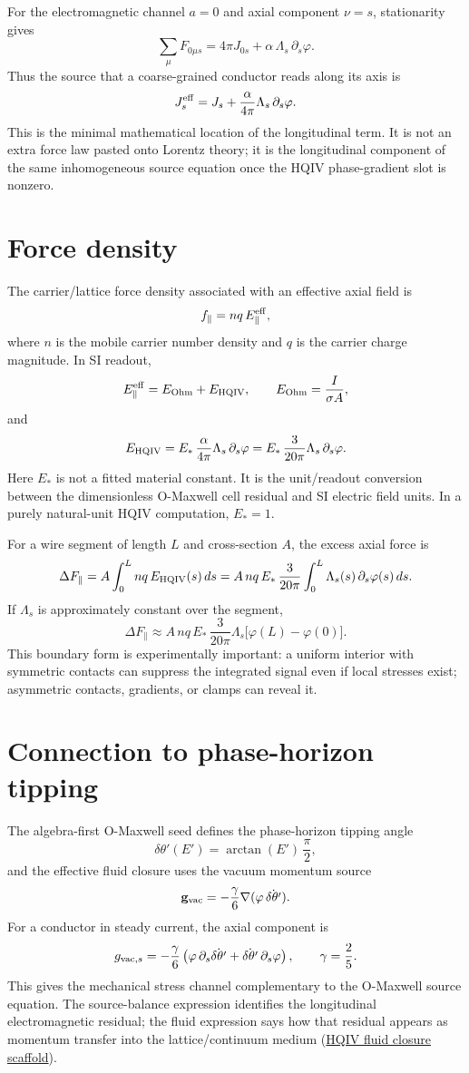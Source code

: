 \documentclass[11pt]{amsart}
\begin{document}
For the electromagnetic channel $a=0$ and axial component $\nu=s$, stationarity gives
\[
\sum_\mu F_{0\mu s}
  =
  4\pi J_{0s}
  +\alpha\,\Lambda_s\,\partial_s\varphi .
\]
Thus the source that a coarse-grained conductor reads along its axis is
\[
J^{\rm eff}_{s}
  =
  J_s+\frac{\alpha}{4\pi}\Lambda_s\,\partial_s\varphi .
\]
This is the minimal mathematical location of the longitudinal term. It is not an extra force law pasted onto Lorentz theory; it is the longitudinal component of the same inhomogeneous source equation once the HQIV phase-gradient slot is nonzero.

\section{Force density}

The carrier/lattice force density associated with an effective axial field is
\[
f_{\parallel}=nq\,E_{\parallel}^{\rm eff},
\]
where $n$ is the mobile carrier number density and $q$ is the carrier charge magnitude. In SI readout,
\[
E_{\parallel}^{\rm eff}
  =
  E_{\rm Ohm}+E_{\rm HQIV},
\qquad
E_{\rm Ohm}=\frac{I}{\sigma A},
\]
and
\[
E_{\rm HQIV}
  =
  E_\ast\,\frac{\alpha}{4\pi}\Lambda_s\,\partial_s\varphi
  =
  E_\ast\,\frac{3}{20\pi}\Lambda_s\,\partial_s\varphi .
\]
Here $E_\ast$ is not a fitted material constant. It is the unit/readout conversion between the dimensionless O-Maxwell cell residual and SI electric field units. In a purely natural-unit HQIV computation, $E_\ast=1$.

For a wire segment of length $L$ and cross-section $A$, the excess axial force is
\[
\Delta F_{\parallel}
  =
  A\int_0^L nq\,E_{\rm HQIV}(s)\,ds
  =
  A\,nq\,E_\ast\,\frac{3}{20\pi}
  \int_0^L \Lambda_s(s)\,\partial_s\varphi(s)\,ds .
\]
If $\Lambda_s$ is approximately constant over the segment,
\[
\Delta F_{\parallel}
  \approx
  A\,nq\,E_\ast\,\frac{3}{20\pi}\Lambda_s
  \bigl[\varphi(L)-\varphi(0)\bigr].
\]
This boundary form is experimentally important: a uniform interior with symmetric contacts can suppress the integrated signal even if local stresses exist; asymmetric contacts, gradients, or clamps can reveal it.

\section{Connection to phase-horizon tipping}

The algebra-first O-Maxwell seed defines the phase-horizon tipping angle
\[
\delta\theta'(E')=\arctan(E')\,\frac{\pi}{2},
\]
and the effective fluid closure uses the vacuum momentum source
\[
\mathbf g_{\rm vac}
  =
  -\frac{\gamma}{6}\nabla(\varphi\,\dot{\delta\theta'}).
\]
For a conductor in steady current, the axial component is
\[
g_{{\rm vac},s}
  =
  -\frac{\gamma}{6}
  \left(\varphi\,\partial_s\dot{\delta\theta'}
        +\dot{\delta\theta'}\,\partial_s\varphi\right),
\qquad
\gamma=\frac25.
\]
This gives the mechanical stress channel complementary to the O-Maxwell source equation. The source-balance expression identifies the longitudinal electromagnetic residual; the fluid expression says how that residual appears as momentum transfer into the lattice/continuum medium
(\hyperref[lean:fluid-closure]{HQIV fluid closure scaffold}).
\end{document}
